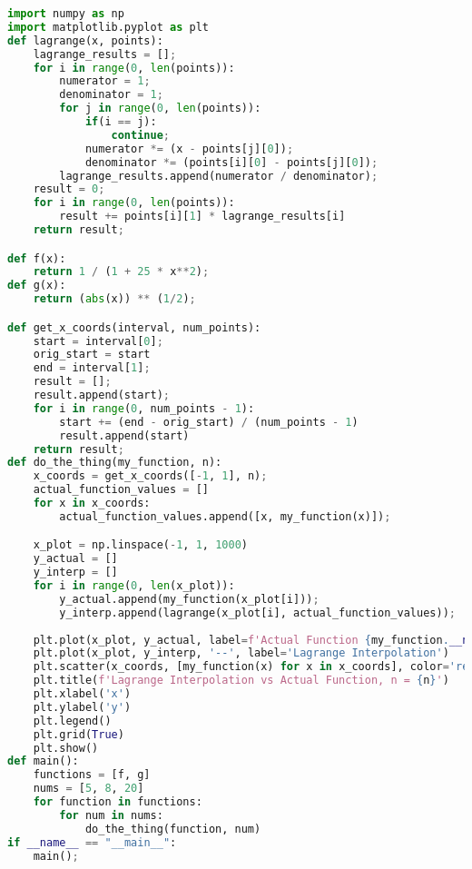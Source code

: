 \documentclass{article}
\begin{document}
\begin{lstlisting}[language=Python]
import numpy as np
import matplotlib.pyplot as plt
def lagrange(x, points):
    lagrange_results = [];
    for i in range(0, len(points)):
        numerator = 1;
        denominator = 1;
        for j in range(0, len(points)):
            if(i == j):
                continue;
            numerator *= (x - points[j][0]);
            denominator *= (points[i][0] - points[j][0]);
        lagrange_results.append(numerator / denominator);
    result = 0;
    for i in range(0, len(points)):
        result += points[i][1] * lagrange_results[i]
    return result;

def f(x):
    return 1 / (1 + 25 * x**2);
def g(x):
    return (abs(x)) ** (1/2);

def get_x_coords(interval, num_points):
    start = interval[0];
    orig_start = start
    end = interval[1];
    result = [];
    result.append(start);
    for i in range(0, num_points - 1):
        start += (end - orig_start) / (num_points - 1)
        result.append(start)
    return result;
def do_the_thing(my_function, n):
    x_coords = get_x_coords([-1, 1], n);
    actual_function_values = []
    for x in x_coords:
        actual_function_values.append([x, my_function(x)]);

    x_plot = np.linspace(-1, 1, 1000)
    y_actual = []
    y_interp = []
    for i in range(0, len(x_plot)):
        y_actual.append(my_function(x_plot[i]));
        y_interp.append(lagrange(x_plot[i], actual_function_values));
    
    plt.plot(x_plot, y_actual, label=f'Actual Function {my_function.__name__}(x)')
    plt.plot(x_plot, y_interp, '--', label='Lagrange Interpolation')
    plt.scatter(x_coords, [my_function(x) for x in x_coords], color='red', label='Interpolation Nodes')
    plt.title(f'Lagrange Interpolation vs Actual Function, n = {n}')
    plt.xlabel('x')
    plt.ylabel('y')
    plt.legend()
    plt.grid(True)
    plt.show()
def main():
    functions = [f, g]
    nums = [5, 8, 20]
    for function in functions:
        for num in nums:
            do_the_thing(function, num)
if __name__ == "__main__":
    main();
\end{lstlisting}
\end{document}
